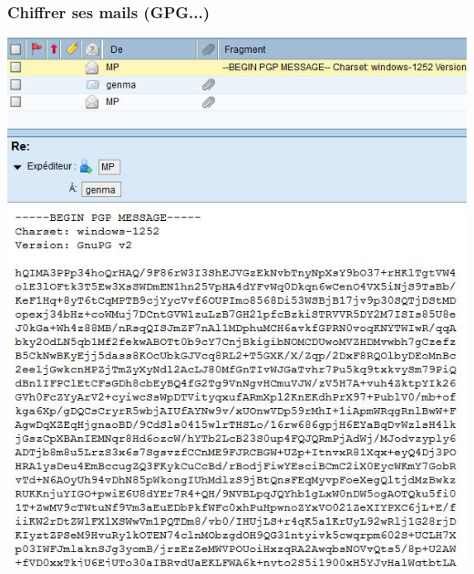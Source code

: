 \documentclass{beamer}
\begin{document}
\begin{frame}
\frametitle{Chiffrer ses mails  (GPG...)}
\begin{center}
\includegraphics[scale=0.5] {./images/chiffrement_mail.jpg}
\end{center}
\end{frame}
\end{document}
